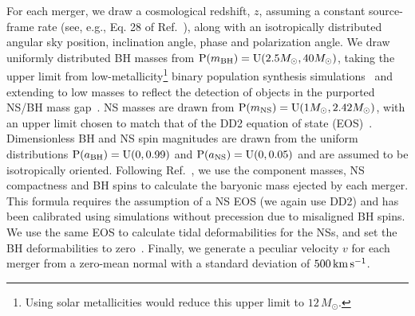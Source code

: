 \documentclass[%
 reprint,
 superscriptaddress,
 nofootinbib,
 amsmath,amssymb,
 aps,
]{revtex4-2}
\newcommand{\msun}{M_\odot}
\newcommand{\prob}{\ensuremath{{\rm P}}}
\newcommand{\abh}{a_{\rm BH}}
\newcommand{\ans}{a_{\rm NS}}
\newcommand{\mbh}{m_{\rm BH}}
\newcommand{\mns}{m_{\rm NS}}
\newcommand{\uniform}{{\rm U}}
\newcommand{\kms}{\ensuremath{{\rm km\,s^{-1}}}}
\begin{document}
For each merger, we draw a cosmological redshift, $z$, assuming a constant source-frame rate (see, e.g., Eq. 28 of Ref.~\cite{Mortlock_etal:2019}), along with an isotropically distributed angular sky position, inclination angle, phase and polarization angle. We draw uniformly distributed BH masses from $\prob(\mbh) = \uniform(2.5\msun, 40\msun)$, taking the upper limit from low-metallicity\footnote{Using solar metallicities would reduce this upper limit to $12\,\msun$.} binary population synthesis simulations~\cite{Kruckow_etal:2018} and extending to low masses to reflect the detection of objects in the purported NS/BH mass gap~\cite{LVC:2020O3acat}. NS masses are drawn from $\prob(\mns) = \uniform(1\msun, 2.42\msun)$, with an upper limit chosen to match that of the DD2 equation of state (EOS)~\cite{Typel_etal:2010,Hempel_etal:2010,Fischer_etal:2014}. Dimensionless BH and NS spin magnitudes are drawn from the uniform distributions $\prob(\abh) = \uniform(0, 0.99)$ and $\prob(\ans) = \uniform(0, 0.05)$ and are assumed to be isotropically oriented. Following Ref.~\cite{Foucart:2012,Foucart_etal:2018}, we use the component masses, NS compactness and BH spins to calculate the baryonic mass ejected by each merger. This formula requires the assumption of a NS EOS (we again use DD2) and has been calibrated using simulations without precession due to misaligned BH spins. We use the same EOS to calculate tidal deformabilities for the NSs, and set the BH deformabilities to zero~\cite{Binnington_Poisson:2009,Pani_etal:2015,Cardoso_etal:2017,Chia:2020}. Finally, we generate a peculiar velocity $v$ for each merger from a zero-mean normal with a standard deviation of $500\,\kms$.
\end{document}

